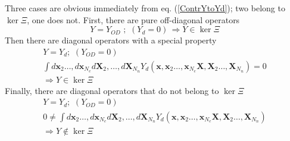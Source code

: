 \documentclass[aps,preprint]{revtex4}%
\begin{document}
Three cases are obvious immediately from eq. (\ref{ContrYtoYd}); two belong to
$\ker\Xi$, one does not. First, there are pure off-diagonal operators
\begin{equation}
Y=Y_{OD}\,\,;\,\,(Y_{d}=0)\,\Rightarrow Y\in\ker\Xi\label{Ycase1}%
\end{equation}
Then there are diagonal operators with a special property
\begin{gather}
Y=Y_{d};\,\,(Y_{OD}=0)\nonumber\\
\int d\mathbf{x}_{2}\ldots,d\mathbf{x}_{N_{e}}d\mathbf{X}_{2},\ldots
,d\mathbf{X}_{N_{n}}Y_{d}(\mathbf{x},\mathbf{x}_{2}\ldots,\mathbf{x}_{N_{e}%
}\mathbf{X},\mathbf{X}_{2}\ldots,\mathbf{X}_{N_{n}})=0\nonumber\\
\Rightarrow Y\in\ker\Xi\label{Ycase2}%
\end{gather}
Finally, there are diagonal operators that do not belong to $\ker\Xi$
\begin{gather}
Y=Y_{d};\,\,(Y_{OD}=0)\nonumber\\
0\neq\int d\mathbf{x}_{2}\ldots,d\mathbf{x}_{N_{e}}d\mathbf{X}_{2}%
,\ldots,d\mathbf{X}_{N_{n}}Y_{d}(\mathbf{x},\mathbf{x}_{2}\ldots
,\mathbf{x}_{N_{e}}\mathbf{X},\mathbf{X}_{2}\ldots,\mathbf{X}_{N_{n}%
})\nonumber\\
\Rightarrow Y\notin\ker\Xi\label{Ycase3}%
\end{gather}
\end{document}
